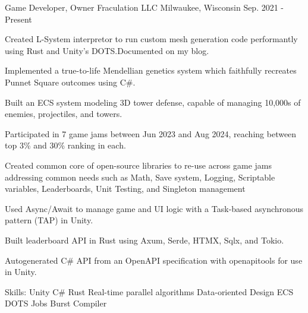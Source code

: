 \begin{cventries}
\cventry
{Game Developer, Owner} %
{Fraculation LLC} %
{Milwaukee, Wisconsin} %
{Sep. 2021 - Present} %
{
  \begin{cvitems} %
    \item {Created L-System interpretor to run custom mesh generation code performantly using Rust and Unity's DOTS.\@ Documented on my blog.}
    \item {Implemented a true-to-life Mendellian genetics system which faithfully recreates Punnet Square outcomes using C\#.}
    \item {Built an ECS system modeling 3D tower defense, capable of managing 10,000s of enemies, projectiles, and towers.}
    \item {Participated in 7 game jams between Jun 2023 and Aug 2024, reaching between top 3\% and 30\% ranking in each.}
    \item {Created common core of open-source libraries to re-use across game jams addressing common needs such as Math, Save system, Logging, Scriptable variables, Leaderboards, Unit Testing, and Singleton management }
    \item {Used Async/Await to manage game and UI logic with a Task-based asynchronous pattern (TAP) in Unity.}
    \item {Built leaderboard API in Rust using Axum, Serde, HTMX, Sqlx, and Tokio.}
    \item {Autogenerated C\# API from an OpenAPI specification with openapitools for use in Unity.}
    \item {Skills: Unity \textbullet{} C\# \textbullet{} Rust \textbullet{} Real-time parallel algorithms \textbullet{} Data-oriented Design \textbullet{} ECS \textbullet{} DOTS \textbullet{} Jobs \textbullet{} Burst Compiler}
  \end{cvitems}
}


\end{cventries}

